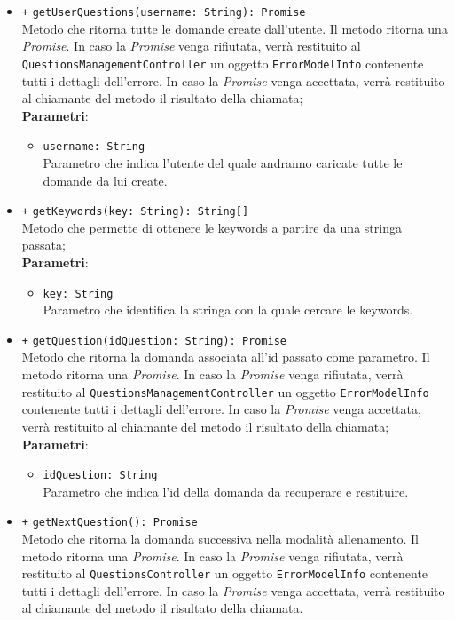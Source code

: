\begin{itemize}
\begin{itemize}
\begin{itemize}
		\end{itemize}
		\item \texttt{+} \texttt{getUserQuestions(username: String): Promise} \\Metodo che ritorna tutte le domande create dall'utente. Il metodo ritorna una \textit{Promise}. In caso la \textit{Promise} venga rifiutata, verrà restituito al \texttt{QuestionsManagementController} un oggetto \texttt{ErrorModelInfo} contenente tutti i dettagli dell'errore. In caso la \textit{Promise} venga accettata, verrà restituito al chiamante del metodo il risultato della chiamata;\\
		\textbf{Parametri}:
		\begin{itemize}
			\item \texttt{username: String} \\ Parametro che indica l'utente del quale andranno caricate tutte le domande da lui create.
		\end{itemize}
		\item \texttt{+} \texttt{getKeywords(key: String): String[]}\\ Metodo che permette di ottenere le keywords a partire da una stringa passata;\\
		\textbf{Parametri}:
		\begin{itemize}
			\item \texttt{key: String} \\ Parametro che identifica la stringa con la quale cercare le keywords.
		\end{itemize}
		\item \texttt{+} \texttt{getQuestion(idQuestion: String): Promise} \\ Metodo che ritorna la domanda associata all'id passato come parametro. Il metodo ritorna una \textit{Promise}. In caso la \textit{Promise} venga rifiutata, verrà restituito al \texttt{QuestionsManagementController} un oggetto \texttt{ErrorModelInfo} contenente tutti i dettagli dell'errore. In caso la \textit{Promise} venga accettata, verrà restituito al chiamante del metodo il risultato della chiamata;\\
		\textbf{Parametri}:
		\begin{itemize}
			\item \texttt{idQuestion: String} \\ Parametro che indica l'id della domanda da recuperare e restituire.
		\end{itemize}
		\item \texttt{+} \texttt{getNextQuestion(): Promise} \\ Metodo che ritorna la domanda successiva nella modalità allenamento. Il metodo ritorna una \textit{Promise}. In caso la \textit{Promise} venga rifiutata, verrà restituito al \texttt{QuestionsController} un oggetto \texttt{ErrorModelInfo} contenente tutti i dettagli dell'errore. In caso la \textit{Promise} venga accettata, verrà restituito al chiamante del metodo il risultato della chiamata.
	\end{itemize}
\end{itemize}